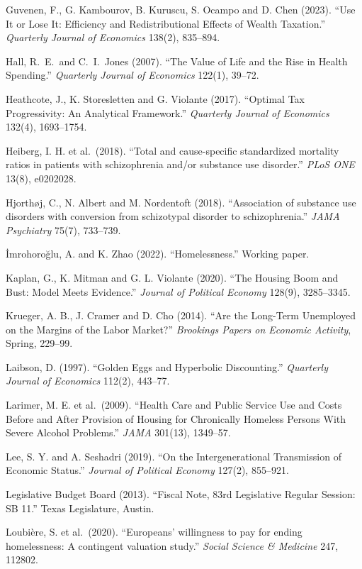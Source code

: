 \documentclass[10pt]{article}
\begin{document}
{\begin{list}{}{\setlength{\leftmargin}{1.5em}\setlength{\itemindent}{-1.5em}\setlength{\itemsep}{0.35em}\setlength{\parsep}{0em}}
\item Guvenen, F., G. Kambourov, B. Kuruscu, S. Ocampo and D. Chen (2023). ``Use It or Lose It: Efficiency and Redistributional Effects of Wealth Taxation.'' \emph{Quarterly Journal of Economics} 138(2), 835--894.
\item Hall, R.\ E.\ and C.\ I.\ Jones (2007). ``The Value of Life and the Rise in Health Spending.'' \emph{Quarterly Journal of Economics} 122(1), 39--72.
\item Heathcote, J., K. Storesletten and G. Violante (2017). ``Optimal Tax Progressivity: An Analytical Framework.'' \emph{Quarterly Journal of Economics} 132(4), 1693--1754.
\item Heiberg, I. H. et al.\ (2018). ``Total and cause-specific standardized mortality ratios in patients with schizophrenia and/or substance use disorder.'' \emph{PLoS ONE} 13(8), e0202028.
\item Hjorth\o j, C., N. Albert and M. Nordentoft (2018). ``Association of substance use disorders with conversion from schizotypal disorder to schizophrenia.'' \emph{JAMA Psychiatry} 75(7), 733--739.
\item \.{I}mrohoro\u{g}lu, A. and K. Zhao (2022). ``Homelessness.'' Working paper.
\item Kaplan, G., K. Mitman and G. L. Violante (2020). ``The Housing Boom and Bust: Model Meets Evidence.'' \emph{Journal of Political Economy} 128(9), 3285--3345.
\item Krueger, A. B., J. Cramer and D. Cho (2014). ``Are the Long-Term Unemployed on the Margins of the Labor Market?'' \emph{Brookings Papers on Economic Activity}, Spring, 229--99.
\item Laibson, D. (1997). ``Golden Eggs and Hyperbolic Discounting.'' \emph{Quarterly Journal of Economics} 112(2), 443--77.
\item Larimer, M. E. et al.\ (2009). ``Health Care and Public Service Use and Costs Before and After Provision of Housing for Chronically Homeless Persons With Severe Alcohol Problems.'' \emph{JAMA} 301(13), 1349--57.
\item Lee, S. Y. and A. Seshadri (2019). ``On the Intergenerational Transmission of Economic Status.'' \emph{Journal of Political Economy} 127(2), 855--921.
\item Legislative Budget Board (2013). ``Fiscal Note, 83rd Legislative Regular Session: SB 11.'' Texas Legislature, Austin.
\item Loubi\`ere, S. et al.\ (2020). ``Europeans' willingness to pay for ending homelessness: A contingent valuation study.'' \emph{Social Science \& Medicine} 247, 112802.

\end{list}}
\end{document}
